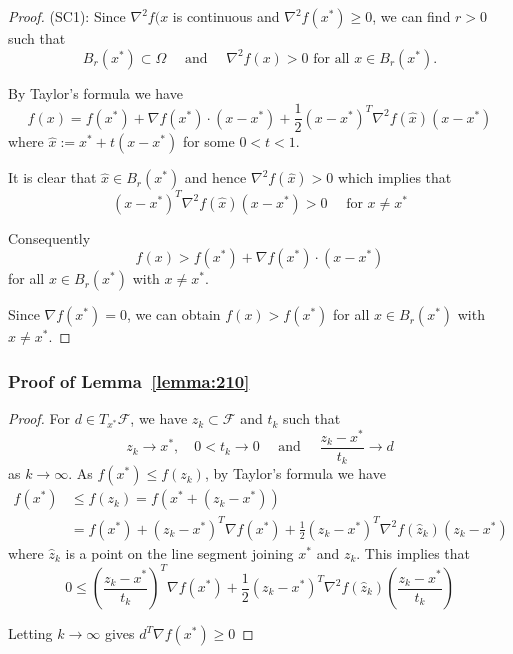 \begin{proof}
(SC1): Since $\nabla^2 f(x$ is continuous and $\nabla^2 f(x^*) \geq 0$, we can find $r > 0$ such that
$$
B_{r}\left(x^{*}\right) \subset \Omega \quad \textrm { and } \quad \nabla^{2} f(x)>0 \textrm { for all } x \in B_{r}\left(x^{*}\right).
$$
\par By Taylor’s formula we have
$$
f(x)=f\left(x^{*}\right)+\nabla f\left(x^{*}\right) \cdot\left(x-x^{*}\right)+\frac{1}{2}\left(x-x^{*}\right)^{T} \nabla^{2} f(\hat{x})\left(x-x^{*}\right)
$$
where $\hat{x} := x^* + t(x - x^*)$ for some $0 < t < 1$.
\par It is clear that $\hat{x} \in B_{r}\left(x^{*}\right)$ and hence $\nabla^2f(\hat{x}) > 0$ which implies that 
$$
\left(x-x^{*}\right)^{T} \nabla^{2} f(\hat{x})\left(x-x^{*}\right)>0 \quad \textrm { for } x \neq x^{*}
$$
\par Consequently
$$
f(x)>f\left(x^{*}\right)+\nabla f\left(x^{*}\right) \cdot\left(x-x^{*}\right)
$$
for all $x \in B_{r}\left(x^{*}\right)$ with $x \neq x^*$. 
\par Since $\nabla f(x^*) = 0$, we can obtain $f(x) > f(x^*)$ for all $x \in B_{r}\left(x^{*}\right)$ with $x \neq x^*$. 
\end{proof}

\subsubsection{Proof of Lemma~\ref{lemma:210}}
\label{appendix:lemma210}
\begin{proof}
    For $d \in T_{x^{*}} \mathscr{F}$, we have ${z_k} \subset \mathscr{F}$ and ${t_k}$ such that
    $$
    z_{k} \rightarrow x^{*}, \quad 0<t_{k} \rightarrow 0 \quad \textrm { and } \quad \frac{z_{k}-x^{*}}{t_{k}} \rightarrow d
    $$
    as $k \rightarrow \infty$. As $f(x^*) \leq f(z_k)$, by Taylor’s formula we have
    $$
    \begin{aligned} f\left(x^{*}\right) & \leq f\left(z_{k}\right)=f\left(x^{*}+\left(z_{k}-x^{*}\right)\right) \\ &=f\left(x^{*}\right)+\left(z_{k}-x^{*}\right)^{T} \nabla f\left(x^{*}\right)+\frac{1}{2}\left(z_{k}-x^{*}\right)^{T} \nabla^{2} f\left(\hat{z}_{k}\right)\left(z_{k}-x^{*}\right) \end{aligned}
    $$
    where $\hat{z}_{k}$ is a point on the line segment joining $x^*$ and $z_k$. This implies that
    $$
    0 \leq\left(\frac{z_{k}-x^{*}}{t_{k}}\right)^{T} \nabla f\left(x^{*}\right)+\frac{1}{2}\left(z_{k}-x^{*}\right)^{T} \nabla^{2} f\left(\hat{z}_{k}\right)\left(\frac{z_{k}-x^{*}}{t_{k}}\right)
    $$
    \par Letting $k \rightarrow \infty$ gives $d^{T} \nabla f\left(x^{*}\right) \geq 0$
\end{proof}


